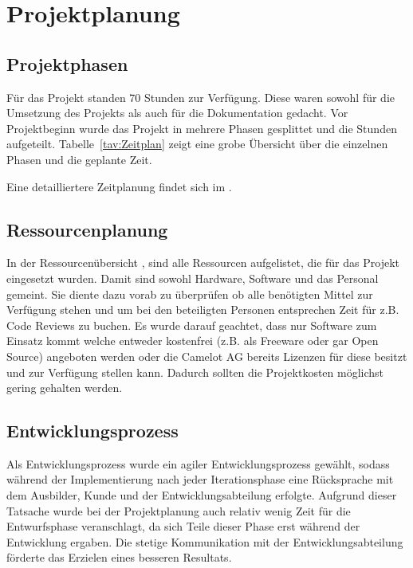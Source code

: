 \section{Projektplanung} 
\label{sec:Projektplanung}

\subsection{Projektphasen}
\label{sec:Projektphasen}
Für das Projekt standen 70 Stunden zur Verfügung. Diese waren sowohl für die Umsetzung des Projekts als auch für die Dokumentation gedacht. Vor Projektbeginn wurde das Projekt in mehrere Phasen gesplittet und die Stunden aufgeteilt. Tabelle~\ref{tav:Zeitplan} zeigt eine grobe Übersicht über die einzelnen Phasen und die geplante Zeit. 

Eine detailliertere Zeitplanung findet sich im .

\subsection{Ressourcenplanung}
\label{sec:Ressourcenplanung}
In der Ressourcenübersicht , sind alle Ressourcen aufgelistet, die für das Projekt eingesetzt wurden. Damit sind sowohl Hardware, Software und das Personal gemeint. Sie diente dazu vorab zu überprüfen ob alle benötigten Mittel zur Verfügung stehen und um bei den beteiligten Personen entsprechen Zeit für z.B. Code Reviews zu buchen. Es wurde darauf geachtet, dass nur Software zum Einsatz kommt welche entweder kostenfrei (z.B. als Freeware oder gar Open Source) angeboten werden oder die Camelot AG bereits Lizenzen für diese besitzt und zur Verfügung stellen kann. Dadurch sollten die Projektkosten möglichst gering gehalten werden.

\subsection{Entwicklungsprozess}
\label{sec:Entwicklungsprozess}
Als Entwicklungsprozess wurde ein agiler Entwicklungsprozess gewählt, sodass während der Implementierung nach jeder Iterationsphase eine Rücksprache mit dem Ausbilder, Kunde und der Entwicklungsabteilung erfolgte. Aufgrund dieser Tatsache wurde bei der Projektplanung auch relativ wenig Zeit für die Entwurfsphase veranschlagt, da sich Teile dieser Phase erst während der Entwicklung ergaben. Die stetige Kommunikation mit der Entwicklungsabteilung förderte das Erzielen eines besseren Resultats.